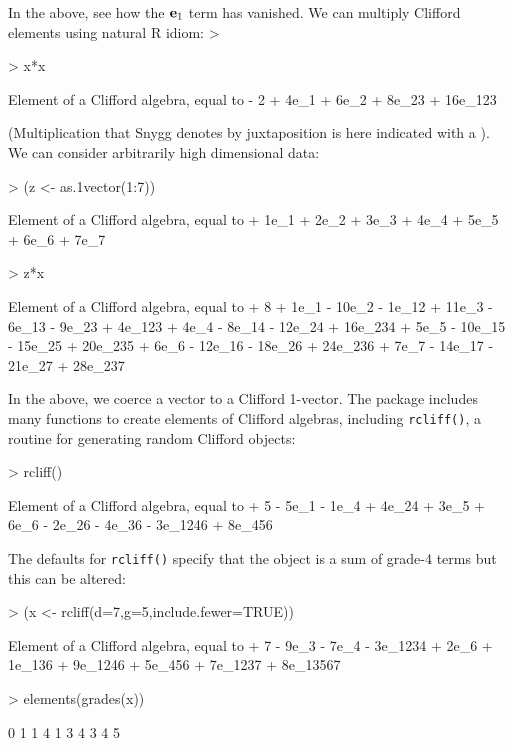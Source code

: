 \documentclass{birkjour}
\theoremstyle{definition}
\theoremstyle{remark}
\numberwithin{equation}{section}
\begin{document}
In the above, see how the ${\bf e}_{1}$ term has vanished.  We can
multiply Clifford elements using natural R idiom:
>
\begin{Schunk}
\begin{Sinput}
> x*x
\end{Sinput}
\begin{Soutput}
Element of a Clifford algebra, equal to
- 2 + 4e_1 + 6e_2 + 8e_23 + 16e_123
\end{Soutput}
\end{Schunk}

(Multiplication that Snygg denotes by juxtaposition is here indicated
with a {\tt *}).  We can consider arbitrarily high dimensional data:

\begin{Schunk}
\begin{Sinput}
> (z <- as.1vector(1:7))
\end{Sinput}
\begin{Soutput}
Element of a Clifford algebra, equal to
+ 1e_1 + 2e_2 + 3e_3 + 4e_4 + 5e_5 + 6e_6 + 7e_7
\end{Soutput}
\begin{Sinput}
> z*x
\end{Sinput}
\begin{Soutput}
Element of a Clifford algebra, equal to
+ 8 + 1e_1 - 10e_2 - 1e_12 + 11e_3 - 6e_13 - 9e_23 + 4e_123 + 4e_4 - 8e_14 -
12e_24 + 16e_234 + 5e_5 - 10e_15 - 15e_25 + 20e_235 + 6e_6 - 12e_16 - 18e_26 +
24e_236 + 7e_7 - 14e_17 - 21e_27 + 28e_237
\end{Soutput}
\end{Schunk}

In the above, we coerce a vector to a Clifford 1-vector.  The package
includes many functions to create elements of Clifford algebras,
including {\tt rcliff()}, a routine for generating random Clifford
objects:

\begin{Schunk}
\begin{Sinput}
> rcliff()
\end{Sinput}
\begin{Soutput}
Element of a Clifford algebra, equal to
+ 5 - 5e_1 - 1e_4 + 4e_24 + 3e_5 + 6e_6 - 2e_26 - 4e_36 - 3e_1246 + 8e_456
\end{Soutput}
\end{Schunk}

The defaults for {\tt rcliff()} specify that the object is a sum of
grade-4 terms but this can be altered:

\begin{Schunk}
\begin{Sinput}
> (x <- rcliff(d=7,g=5,include.fewer=TRUE))
\end{Sinput}
\begin{Soutput}
Element of a Clifford algebra, equal to
+ 7 - 9e_3 - 7e_4 - 3e_1234 + 2e_6 + 1e_136 + 9e_1246 + 5e_456 + 7e_1237 +
8e_13567
\end{Soutput}
\begin{Sinput}
> elements(grades(x))
\end{Sinput}
\begin{Soutput}
 [1] 0 1 1 4 1 3 4 3 4 5
\end{Soutput}
\end{Schunk}
\end{document}
